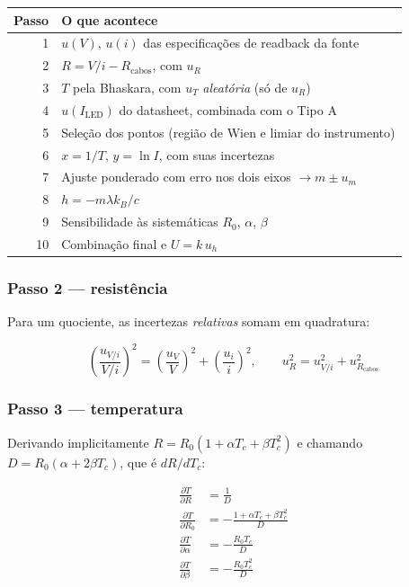 \documentclass[11pt,a4paper]{article}
\begin{document}
\begin{center}
\begin{tabular}{@{}rl@{}}
\toprule
\textbf{Passo} & \textbf{O que acontece} \\
\midrule
1 & $u(V)$, $u(i)$ das especificações de readback da fonte \\
2 & $R = V/i - R_{\text{cabos}}$, com $u_R$ \\
3 & $T$ pela Bhaskara, com $u_T$ \emph{aleatória} (só de $u_R$) \\
4 & $u(I_{\text{LED}})$ do datasheet, combinada com o Tipo A \\
5 & Seleção dos pontos (região de Wien e limiar do instrumento) \\
6 & $x = 1/T$, $y = \ln I$, com suas incertezas \\
7 & Ajuste ponderado com erro nos dois eixos $\rightarrow m \pm u_m$ \\
8 & $h = -m\lambda k_B/c$ \\
9 & Sensibilidade às sistemáticas $R_0$, $\alpha$, $\beta$ \\
10 & Combinação final e $U = k\,u_h$ \\
\bottomrule
\end{tabular}
\end{center}

\subsubsection*{Passo 2 --- resistência}

Para um quociente, as incertezas \emph{relativas} somam em quadratura:

\begin{equation}
  \left(\frac{u_{V/i}}{V/i}\right)^2 = \left(\frac{u_V}{V}\right)^2
                                     + \left(\frac{u_i}{i}\right)^2,
  \qquad
  u_R^2 = u_{V/i}^2 + u_{R_{\text{cabos}}}^2
  \label{eq:uR}
\end{equation}

\subsubsection*{Passo 3 --- temperatura}

Derivando implicitamente $R = R_0(1 + \alpha T_c + \beta T_c^2)$ e chamando
$D = R_0(\alpha + 2\beta T_c)$, que é $dR/dT_c$:

\begin{align}
  \frac{\partial T}{\partial R}      &= \frac{1}{D}  \label{eq:dTdR}\\[0.3em]
  \frac{\partial T}{\partial R_0}    &= -\frac{1 + \alpha T_c + \beta T_c^2}{D} \label{eq:dTdR0}\\[0.3em]
  \frac{\partial T}{\partial \alpha} &= -\frac{R_0 T_c}{D}   \label{eq:dTda}\\[0.3em]
  \frac{\partial T}{\partial \beta}  &= -\frac{R_0 T_c^2}{D} \label{eq:dTdb}
\end{align}
\end{document}

